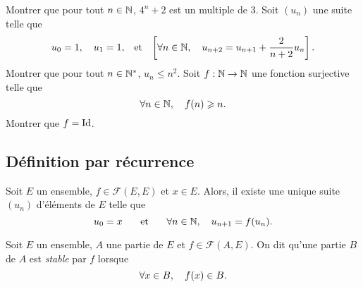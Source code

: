 \documentclass{magnolia}
\begin{document}
\begin{exos}
\exo Montrer que pour tout $n\in\mathbb{N}$, $4^n+2$ est un multiple de 3.
\exo Soit $(u_n)$ une suite telle que
  \[u_0=1,\quad u_1=1, \quad\!\text{et}\quad\!\left[\forall n\in\mathbb{N},\quad u_{n+2}=u_{n+1}+\frac{2}{n+2}u_n\right].\]
  Montrer que pour tout $n\in{\mathbb{N}^*}$, $u_n\leq n^2$.
\exo Soit $f:\mathbb{N}\to\mathbb{N}$ une fonction surjective telle que
  \[\forall n\in\mathbb{N},\quad f(n)\geqslant n.\]
  Montrer que $f=\operatorname{Id}$.
\end{exos}



\subsection{Définition par récurrence}

\begin{proposition}
Soit $E$ un ensemble, $f\in\mathcal{F}(E,E)$  et $x\in E$. Alors, il existe une unique
suite $(u_n)$ d'éléments de $E$ telle que
\[u_0=x \quad\quad\!\text{et}\quad\!\quad \forall n\in\mathbb{N},\quad u_{n+1}=f(u_n).\]
\end{proposition}

\begin{definition}
Soit $E$ un ensemble, $A$ une partie de $E$ et $f\in\mathcal{F}(A, E)$. On dit qu'une
partie $B$ de $A$ est \emph{stable} par $f$ lorsque
\[\forall x\in B,\quad f(x)\in B.\]
\end{definition}
\end{document}
